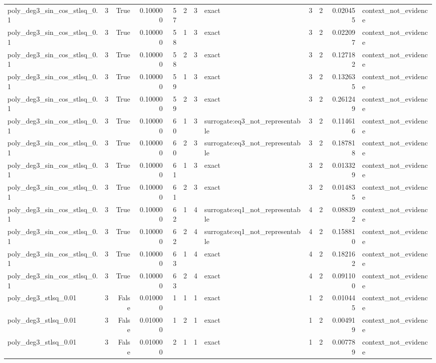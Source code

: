\begin{tabular}{lrrrrrrlrrrl}
poly\_deg3\_sin\_cos\_stlsq\_0.1 & 3 & True & 0.100000 & 57 & 2 & 3 & exact & 3 & 2 & 0.020455 & context\_not\_evidence \\
poly\_deg3\_sin\_cos\_stlsq\_0.1 & 3 & True & 0.100000 & 58 & 1 & 3 & exact & 3 & 2 & 0.022097 & context\_not\_evidence \\
poly\_deg3\_sin\_cos\_stlsq\_0.1 & 3 & True & 0.100000 & 58 & 2 & 3 & exact & 3 & 2 & 0.127182 & context\_not\_evidence \\
poly\_deg3\_sin\_cos\_stlsq\_0.1 & 3 & True & 0.100000 & 59 & 1 & 3 & exact & 3 & 2 & 0.132635 & context\_not\_evidence \\
poly\_deg3\_sin\_cos\_stlsq\_0.1 & 3 & True & 0.100000 & 59 & 2 & 3 & exact & 3 & 2 & 0.261249 & context\_not\_evidence \\
poly\_deg3\_sin\_cos\_stlsq\_0.1 & 3 & True & 0.100000 & 60 & 1 & 3 & surrogate:eq3\_not\_representable & 3 & 2 & 0.114616 & context\_not\_evidence \\
poly\_deg3\_sin\_cos\_stlsq\_0.1 & 3 & True & 0.100000 & 60 & 2 & 3 & surrogate:eq3\_not\_representable & 3 & 2 & 0.187818 & context\_not\_evidence \\
poly\_deg3\_sin\_cos\_stlsq\_0.1 & 3 & True & 0.100000 & 61 & 1 & 3 & exact & 3 & 2 & 0.013329 & context\_not\_evidence \\
poly\_deg3\_sin\_cos\_stlsq\_0.1 & 3 & True & 0.100000 & 61 & 2 & 3 & exact & 3 & 2 & 0.014835 & context\_not\_evidence \\
poly\_deg3\_sin\_cos\_stlsq\_0.1 & 3 & True & 0.100000 & 62 & 1 & 4 & surrogate:eq1\_not\_representable & 4 & 2 & 0.088392 & context\_not\_evidence \\
poly\_deg3\_sin\_cos\_stlsq\_0.1 & 3 & True & 0.100000 & 62 & 2 & 4 & surrogate:eq1\_not\_representable & 4 & 2 & 0.158810 & context\_not\_evidence \\
poly\_deg3\_sin\_cos\_stlsq\_0.1 & 3 & True & 0.100000 & 63 & 1 & 4 & exact & 4 & 2 & 0.182162 & context\_not\_evidence \\
poly\_deg3\_sin\_cos\_stlsq\_0.1 & 3 & True & 0.100000 & 63 & 2 & 4 & exact & 4 & 2 & 0.091100 & context\_not\_evidence \\
poly\_deg3\_stlsq\_0.01 & 3 & False & 0.010000 & 1 & 1 & 1 & exact & 1 & 2 & 0.010445 & context\_not\_evidence \\
poly\_deg3\_stlsq\_0.01 & 3 & False & 0.010000 & 1 & 2 & 1 & exact & 1 & 2 & 0.004919 & context\_not\_evidence \\
poly\_deg3\_stlsq\_0.01 & 3 & False & 0.010000 & 2 & 1 & 1 & exact & 1 & 2 & 0.007789 & context\_not\_evidence \\

\end{tabular}
